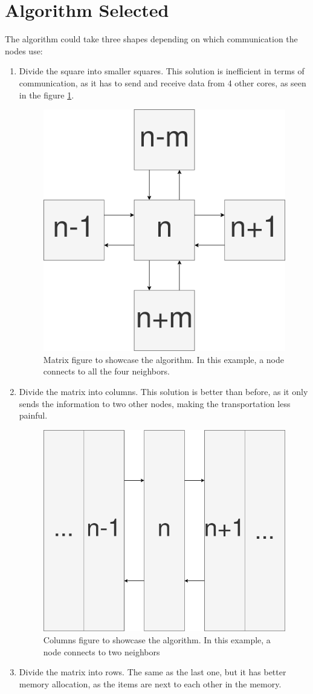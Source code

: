 \documentclass[11pt, a4paper]{article}
\begin{document}
	\section{Algorithm Selected}
	The algorithm could take three shapes depending on which communication the nodes use:
\begin{enumerate} %
	\item Divide the square into smaller squares. This solution is inefficient in terms of communication, as it has to send and receive data from 4 other cores, as seen in the figure \ref{fig:matrix}.
\begin{figure}[H]
	\centering
	\includegraphics[width=0.4\linewidth]{imgs/matrix}
	\caption[Matrix Communication]{Matrix figure to showcase the algorithm. In this example, a node connects to all the four neighbors.}
	\label{fig:matrix}
\end{figure}
	\item Divide the matrix into columns. This solution is better than before, as it only sends the information to two other nodes, making the transportation less painful.
%
\begin{figure}[H]
	\centering
	\includegraphics[width=0.4\linewidth]{imgs/rows}
	\caption[Columns Communication]{Columns figure to showcase the algorithm. In this example, a node connects to two neighbors}
	\label{fig:columns}
\end{figure}
%
	\item Divide the matrix into rows. The same as the last one, but it has better memory allocation, as the items are next to each other in the memory.

\end{enumerate}
\end{document}
